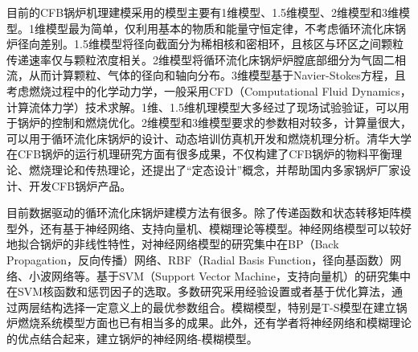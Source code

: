 目前的CFB锅炉机理建模采用的模型主要有1维模型、1.5维模型、2维模型和3维模型\cite{gungor2008}。1维模型最为简单，仅利用基本的物质和能量守恒定律，不考虑循环流化床锅炉径向差别。1.5维模型将径向截面分为稀相核和密相环，且核区与环区之间颗粒传递速率仅与颗粒浓度相关\cite{程从礼2002气固循环流化床能量最小多尺度环核}。2维模型将循环流化床锅炉炉膛底部细分为气固二相流，从而计算颗粒、气体的径向和轴向分布。3维模型基于Navier-Stokes方程，且考虑燃烧过程中的化学动力学，一般采用CFD（Computational Fluid Dynamics，计算流体力学）技术求解\cite{basu1999combustion}。1维、1.5维机理模型大多经过了现场试验验证，可以用于锅炉的控制和燃烧优化\cite{王新2008循环流化床动态建模及其预测控制研究}。2维模型和3维模型要求的参数相对较多，计算量很大，可以用于循环流化床锅炉的设计、动态培训仿真机开发和燃烧机理分析\cite{张晓磊2007循环流化床锅炉燃烧系统仿真}。清华大学在CFB锅炉的运行机理研究方面有很多成果，不仅构建了CFB锅炉的物料平衡理论、燃烧理论和传热理论，还提出了“定态设计”概念，并帮助国内多家锅炉厂家设计、开发CFB锅炉产品\cite{杨石2010基于流态重构的低能耗循环流化床锅炉技术,杨建华2009循环流化床锅炉改变床存量的燃烧试验}。

目前数据驱动的循环流化床锅炉建模方法有很多。除了传递函数和状态转移矩阵模型外，还有基于神经网络、支持向量机、模糊理论等模型\cite{赵伟杰2007循环流化床锅炉床温的控制特性,樊诚2007循环流化床锅炉燃烧过程建模研究,李易平1991循环流化床锅炉床温及床压建模}。神经网络模型可以较好地拟合锅炉的非线性特性，对神经网络模型的研究集中在BP（Back Propagation，反向传播）网络、RBF（Radial Basis Function，径向基函数）网络、小波网络等\cite{pulluri2005wavelet}。基于SVM（Support Vector Machine，支持向量机）的研究集中在SVM核函数和惩罚因子的选取\cite{RePEc:eee:energy:v:124:y:2017:i:c:p:284-294}。多数研究采用经验设置或者基于优化算法，通过两层结构选择一定意义上的最优参数组合。模糊模型，特别是T-S模型在建立锅炉燃烧系统模型方面也已有相当多的成果。此外，还有学者将神经网络和模糊理论的优点结合起来，建立锅炉的神经网络-模糊模型\cite{董湛波2012基于神经}。


